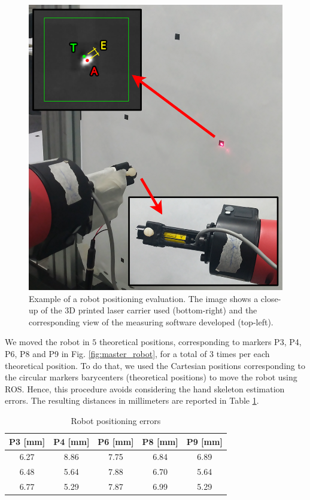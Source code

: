 \documentclass[a4paper, 10pt, conference]{ieeeconf}      %
\begin{document}
\begin{figure} [h!]
  \centering
  \includegraphics[width=0.7\columnwidth]{figures/lasermount.png}
  \caption{Example of a robot positioning evaluation. The image shows a close-up of the 3D printed laser carrier used (bottom-right) and the corresponding view of the measuring software developed (top-left).}
  \label{fig:laser}
\end{figure}

We moved the robot in $5$ theoretical positions, corresponding to markers P3, P4, P6, P8 and P9 in Fig. \ref{fig:master_robot}, for a total of $3$ times per each theoretical position. To do that, we used the Cartesian positions corresponding to the circular markers barycenters (theoretical positions) to move the robot using ROS. Hence, this procedure avoids considering the hand skeleton estimation errors.
The resulting distances in millimeters are reported in Table \ref{tab:laser}.

\begin{table}[h]
\begin{center}
\caption{Robot positioning errors}
\label{tab:laser}
\begin{tabular}{|c|c||c||c||c|}
\hline
\textbf{P3 [mm]} & \textbf{P4 [mm]} & \textbf{P6 [mm]} & \textbf{P8 [mm]} & \textbf{P9 [mm]} \\
\hline
6.27 & 8.86 &  7.75 & 6.84 & 6.89\\
6.48 & 5.64 & 7.88 & 6.70 & 5.64\\
6.77 & 5.29 & 7.87 & 6.99 & 5.29\\
\hline
\end{tabular}
\end{center}
\end{table}
\end{document}
